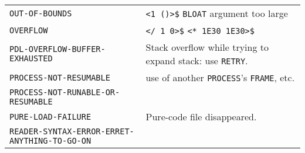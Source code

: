 \documentclass[a4paper]{scrbook}
\begin{document}
\begin{longtable}[]{@{}ll@{}}
\begin{minipage}[t]{0.58\columnwidth}
\texttt{OUT-OF-BOUNDS}\strut
\end{minipage} & \begin{minipage}[t]{0.36\columnwidth}\raggedright\strut
\texttt{\textless{}1\ \textquotesingle{}()\textgreater{}\$} \texttt{BLOAT} argument too large\strut
\end{minipage}\tabularnewline
\begin{minipage}[t]{0.58\columnwidth}\raggedright\strut
\texttt{OVERFLOW}\strut
\end{minipage} & \begin{minipage}[t]{0.36\columnwidth}\raggedright\strut
\texttt{\textless{}/\ 1\ 0\textgreater{}\$} \texttt{\textless{}*\ 1E30\ 1E30\textgreater{}\$}\strut
\end{minipage}\tabularnewline
\begin{minipage}[t]{0.58\columnwidth}\raggedright\strut
\texttt{PDL-OVERFLOW-BUFFER-EXHAUSTED}\strut
\end{minipage} & \begin{minipage}[t]{0.36\columnwidth}\raggedright\strut
Stack overflow while trying to expand stack: use \texttt{RETRY}.\strut
\end{minipage}\tabularnewline
\begin{minipage}[t]{0.58\columnwidth}\raggedright\strut
\texttt{PROCESS-NOT-RESUMABLE}\strut
\end{minipage} & \begin{minipage}[t]{0.36\columnwidth}\raggedright\strut
use of another \texttt{PROCESS}'s \texttt{FRAME}, etc.\strut
\end{minipage}\tabularnewline
\begin{minipage}[t]{0.58\columnwidth}\raggedright\strut
\texttt{PROCESS-NOT-RUNABLE-OR-RESUMABLE}\strut
\end{minipage} & \begin{minipage}[t]{0.36\columnwidth}\raggedright\strut
\strut
\end{minipage}\tabularnewline
\begin{minipage}[t]{0.58\columnwidth}\raggedright\strut
\texttt{PURE-LOAD-FAILURE}\strut
\end{minipage} & \begin{minipage}[t]{0.36\columnwidth}\raggedright\strut
Pure-code file disappeared.\strut
\end{minipage}\tabularnewline
\begin{minipage}[t]{0.58\columnwidth}\raggedright\strut
\texttt{READER-SYNTAX-ERROR-ERRET-ANYTHING-TO-GO-ON}\strut
\end{minipage} & \begin{minipage}[t]{0.36\columnwidth}\raggedright\strut

\end{minipage}
\end{longtable}
\end{document}
